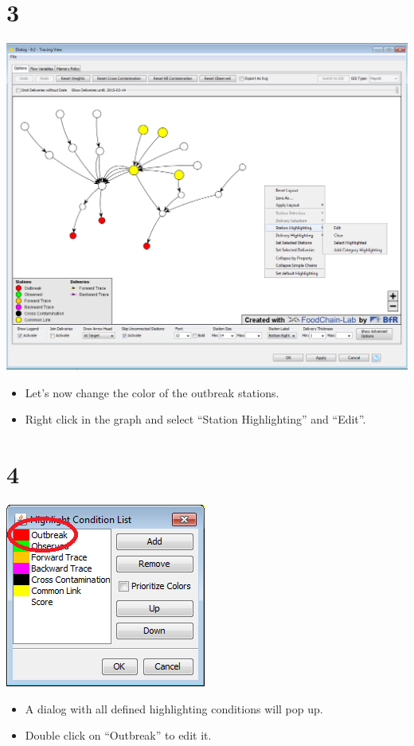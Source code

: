 \documentclass[10pt]{beamer}
\begin{document}
\section{3}
\begin{frame}
	\begin{center}
  		\includegraphics[height=0.6\textheight]{3.png}
	\end{center}
	\begin{itemize}
		\item Let's now change the color of the outbreak stations.
		\item Right click in the graph and select ``Station Highlighting'' and ``Edit''.
	\end{itemize}
\end{frame}

\section{4}
\begin{frame}
	\begin{center}
  		\includegraphics[scale=0.6]{4.png}
	\end{center}
	\begin{itemize}
		\item A dialog with all defined highlighting conditions will pop up.
		\item Double click on ``Outbreak'' to edit it.
	\end{itemize}
\end{frame}
\end{document}
